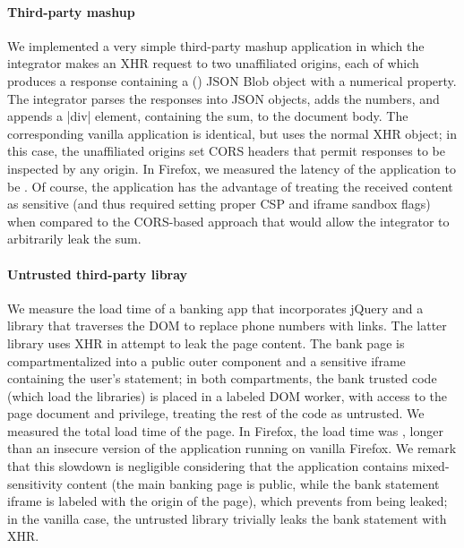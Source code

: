 \paragraph{Third-party mashup}

We implemented a very simple third-party mashup application in which
the integrator makes an XHR request to two unaffiliated origins, each
of which produces a response containing a () JSON Blob
object with a numerical property.
%
The integrator parses the responses into JSON objects, adds the
numbers, and appends a \js|div| element, containing the sum, to the
document body.
%
The corresponding vanilla application is identical, but uses the
normal XHR object; in this case, the unaffiliated origins set CORS
headers that permit responses to be inspected by any origin.
%
In Firefox, we measured the latency of the application to be
.
%
Of course, the \sys{} application has the advantage of treating the
received content as sensitive (and thus required setting proper CSP
and iframe sandbox flags) when compared to the CORS-based approach
that would allow the integrator to arbitrarily leak the sum.

\paragraph{Untrusted third-party libray}

We measure the load time of a banking app that incorporates jQuery and
a library that traverses the DOM to replace phone numbers with links.
%
The latter library uses XHR in attempt to leak the page content.
%
The bank page is compartmentalized into a public outer component and
a sensitive iframe containing the user's statement;
in both compartments, the bank trusted code (which load the libraries)
is placed in a labeled DOM worker, with access to the page document
and privilege, treating the rest of the code as untrusted.
%
We measured the total load time of the page.
%
In Firefox, the load time was ,  longer than
an insecure version of the application running on vanilla Firefox.
%
We remark that this slowdown is negligible considering that the
application contains mixed-sensitivity content (the main banking page
is public, while the bank statement iframe is labeled with the origin
of the page), which \sys{} prevents from being leaked; in the vanilla
case, the untrusted library trivially leaks the bank statement with
XHR.

